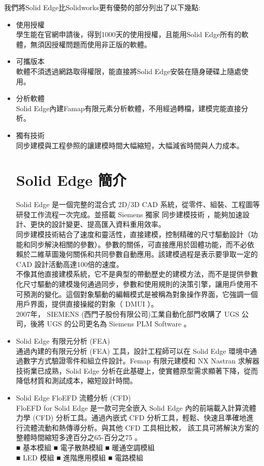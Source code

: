 我們將Solid Edge比Solidworks更有優勢的部分列出了以下幾點:\\[8pt]
\begin{itemize}
\item 使用授權\\
學生能在官網申請後，得到1000天的使用授權，且能用Solid Edge所有的軟體，無須因授權問題而使用非正版的軟體。\\
\item 可攜版本\\
軟體不須透過網路取得權限，能直接將Solid Edge安裝在隨身硬碟上隨處使用。\\
\item 分析軟體\\
Solid Edge內建Famap有限元素分析軟體，不用經過轉檔，建模完能直接分析。\\
\item 獨有技術\\
同步建模與工程參照的讓建模時間大幅縮短，大幅減省時間與人力成本。\\
\section{Solid Edge 簡介}
Solid Edge 是一個完整的混合式 2D/3D CAD 系統，從零件、組裝、工程圖等研發工作流程一次完成。並搭載 Siemens 獨家 同步建模技術 ，能夠加速設計、更快的設計變更、提高匯入資料重用效率。\\

同步建模技術結合了速度和靈活性，直接建模，控制精確的尺寸驅動設計（功能和同步解決相關的參數）。參數的關係，可直接應用於固體功能，而不必依賴於二維草圖幾何關係和共同參數自動應用。該建模過程是表示要爭取一定的 CAD 設計活動高達100倍的速度。\\

不像其他直接建模系統，它不是典型的帶動歷史的建模方法，而不是提供參數化尺寸驅動的建模幾何通過同步，參數和使用規則的決策引擎，讓用戶使用不可預測的變化。這個對象驅動的編輯模式是被稱為對象操作界面，它強調一個用戶界面，提供直接操縱的對象（ DMUI ）。\\

2007年， SIEMENS (西門子股份有限公司)工業自動化部門收購了 UGS 公司，後將 UGS 的公司更名為 Siemens PLM Software 。 \\
\item Solid Edge 有限元分析 (FEA)\\
通過內建的有限元分析 (FEA) 工具，設計工程師可以在 Solid Edge 環境中通過數字方式驗證零件和組立件設計。Femap 有限元建模和 NX Nastran 求解器技術業已成熟，Solid Edge 分析在此基礎上，使實體原型需求顯著下降，從而降低材質和測試成本，縮短設計時間。\\
\item Solid Edge FloEFD 流體分析 (CFD)\\
FloEFD for Solid Edge 是一款可完全嵌入 Solid Edge 內的前端載入計算流體力學 (CFD) 分析工具。通過內嵌式 CFD 分析工具，輕鬆、快速且準確地進行流體流動和熱傳導分析。與其他 CFD 工具相比較， 該工具可將解決方案的整體時間縮短多達百分之65-百分之75 。\\
■ 基本模組 ■ 電子散熱模組 ■ 暖通空調模組\\
■ LED 模組 ■ 進階應用模組 ■ 電路模組\\


\end{itemize}
